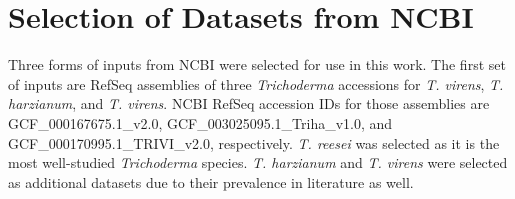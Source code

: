 




\section{Selection of Datasets from NCBI}
\label{met:datasets}

Three forms of inputs from NCBI were selected for use in this
work. The first set of inputs are RefSeq assemblies of three
\textit{Trichoderma} accessions for \textit{T. virens},
\textit{T. harzianum}, and \textit{T. virens}. NCBI RefSeq accession
IDs for those assemblies are GCF\_000167675.1\_v2.0,
GCF\_003025095.1\_Triha\_v1.0, and GCF\_000170995.1\_TRIVI\_v2.0,
respectively. \textit{T. reesei} was selected as it is the most
well-studied \textit{Trichoderma} species. \textit{T. harzianum} and
\textit{T. virens} were selected as additional datasets due to their
prevalence in literature as well.


